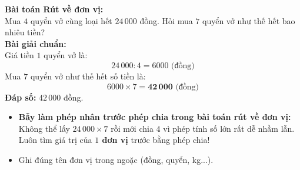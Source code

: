 \documentclass[11pt,a4paper]{article}
\begin{document}
\vspace{-2.5mm}
\noindent
\begin{minipage}[t]{0.49\textwidth}\vspace{0pt}
\begin{tcolorbox}[
  enhanced,
  colback=green!4!white,
  colframe=green!60!black,
  arc=2mm, boxrule=0.8pt,
  left=2mm, right=2mm, top=1.8mm, bottom=1.8mm,
  title={\footnotesize\bfseries\color{white}\faCheckCircle\ Ví dụ thực hành chuẩn mực}
]
{\footnotesize
\textbf{Bài toán Rút về đơn vị:}\\
Mua $4$ quyển vở cùng loại hết $24\,000$ đồng. Hỏi mua $7$ quyển vở như thế hết bao nhiêu tiền?\\
\textbf{Bài giải chuẩn:}\\
Giá tiền $1$ quyển vở là:
$$24\,000 : 4 = 6000\text{ (đồng)}$$
Mua $7$ quyển vở như thế hết số tiền là:
$$6000 \times 7 = \mathbf{42\,000}\text{ (đồng)}$$
\phantom{Bài giải: }\textbf{Đáp số:} $42\,000$ đồng.
}
\end{tcolorbox}
\end{minipage}
\hfill
\begin{minipage}[t]{0.49\textwidth}\vspace{0pt}
\begin{tcolorbox}[
  enhanced,
  colback=red!4!white,
  colframe=red!70!black,
  arc=2mm, boxrule=0.8pt,
  left=2mm, right=2mm, top=1.8mm, bottom=1.8mm,
  title={\footnotesize\bfseries\color{white}\faExclamationTriangle\ Mẹo tránh bẫy trắc nghiệm}
]
{\footnotesize
\begin{itemize}\setlength{\itemsep}{1.5pt}\setlength{\leftskip}{-2.5mm}
  \item \textbf{Bẫy làm phép nhân trước phép chia trong bài toán rút về đơn vị:}\\
  Không thể lấy $24\,000 \times 7$ rồi mới chia $4$ vì phép tính số lớn rất dễ nhầm lẫn. Luôn tìm giá trị của \textbf{$1$ đơn vị} trước bằng phép chia!
  \item Ghi đúng tên đơn vị trong ngoặc (đồng, quyển, kg...).
\end{itemize}
}
\end{tcolorbox}
\end{minipage}
\end{document}

